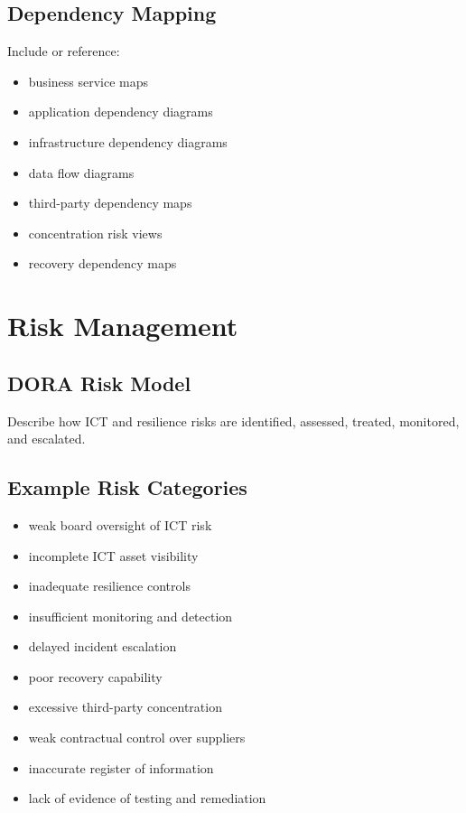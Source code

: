 \documentclass[
  letterpaper,
  DIV=11,
  numbers=noendperiod]{scrartcl}
\providecommand{\tightlist}{%
  \setlength{\itemsep}{0pt}\setlength{\parskip}{0pt}}
\begin{document}
\subsection{Dependency Mapping}\label{dependency-mapping}

Include or reference:

\begin{itemize}
\tightlist
\item
  business service maps
\item
  application dependency diagrams
\item
  infrastructure dependency diagrams
\item
  data flow diagrams
\item
  third-party dependency maps
\item
  concentration risk views
\item
  recovery dependency maps
\end{itemize}

\section{Risk Management}\label{risk-management}

\subsection{DORA Risk Model}\label{dora-risk-model}

Describe how ICT and resilience risks are identified, assessed, treated,
monitored, and escalated.

\subsection{Example Risk Categories}\label{example-risk-categories}

\begin{itemize}
\tightlist
\item
  weak board oversight of ICT risk
\item
  incomplete ICT asset visibility
\item
  inadequate resilience controls
\item
  insufficient monitoring and detection
\item
  delayed incident escalation
\item
  poor recovery capability
\item
  excessive third-party concentration
\item
  weak contractual control over suppliers
\item
  inaccurate register of information
\item
  lack of evidence of testing and remediation
\end{itemize}
\end{document}

